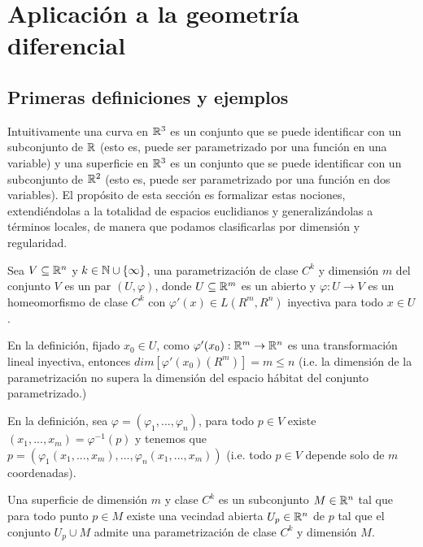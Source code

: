 \chapter{Aplicación a la geometría diferencial}
\section{Primeras definiciones y ejemplos}
Intuitivamente una curva en ${\mathbb{R}}^{3}$ es un conjunto que se puede identificar con un subconjunto de ${\mathbb{R}}$ (esto es, puede ser parametrizado por una función en una variable) y una superficie en ${\mathbb{R}}^{3}$ es un conjunto que se puede identificar con un subconjunto de ${\mathbb{R}}^{2}$  (esto es, puede ser parametrizado por una función en dos variables). El propósito de esta sección es formalizar estas nociones, extendiéndolas a la totalidad de espacios euclidianos y generalizándolas a términos locales, de manera que podamos clasificarlas por dimensión y regularidad.

\begin{Def}
Sea $V\subseteq{\mathbb{R}}^{n}$ y $k\in{\mathbb{N}}\cup\{\infty\}$, una parametrización de clase $C^{k}$ y dimensión $m$ del conjunto $V$ es un par $(U,\varphi)$, donde $U\subseteq{\mathbb{R}}^{m}$ es un abierto y $\varphi:U\rightarrow V$ es un homeomorfismo de clase $C^{k}$ con $\varphi'(x)\in L(R^{m},R^{n})$ inyectiva para todo $x\in U$.
\end{Def}

\begin{Obs}
En la definición, fijado $x_{0}\in U$, como $\varphi'(x_{0}):{\mathbb{R}}^{m}\rightarrow{\mathbb{R}}^{n}$ es una transformación lineal inyectiva, entonces $dim[\varphi'(x_{0})(R^{m})]=m\leq n$ (i.e. la dimensión de la parametrización no supera la dimensión del espacio hábitat del conjunto parametrizado.)
\end{Obs}

\begin{Obs}
En la definición, sea $\varphi=(\varphi_{1},...,\varphi_{n})$, para todo $p\in V$ existe $(x_{1},...,x_{m})=\varphi^{-1}(p)$ y tenemos que $p=(\varphi_{1}(x_{1},...,x_{m}),...,\varphi_{n}(x_{1},...,x_{m}))$ (i.e. todo $p\in V$ depende solo de $m$ coordenadas).
\end{Obs}
\begin{Def} Una superficie de dimensión $m$ y clase $C^{k}$ es un subconjunto $M\in{\mathbb{R}}^{n}$ tal que para todo punto $p\in M$ existe una vecindad abierta $U_{p}\in {\mathbb{R}}^{n}$ de $p$ tal que el conjunto $U_{p}\cup M$ admite una parametrización de clase $C^{k}$ y dimensión $M$.
\end{Def}

